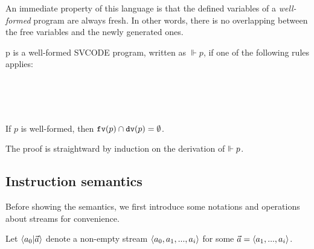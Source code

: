 An immediate property of this language is that the defined variables of a \emph{well-formed} \fmsvcode program are always fresh. In other words, there is no overlapping between the free variables and the newly generated ones.

\begin{defi}
	p is a well-formed SVCODE program, written as $\Vdash p$, if one of the following rules applies:
\end{defi}
	
	\PT{\Axiom{\wf{\epsilon}}}
    \\[3ex]
   	
   	\\[3ex]
   
   \\[3ex]
   


\begin{lem}
	If $p$ is well-formed, then  $\mathtt{fv}(p) \cap \mathtt{dv}(p) = \emptyset $. 
\end{lem}

The proof is straightward by induction on the derivation of $\Vdash p$.


\subsection{Instruction semantics}

Before showing the semantics, we first introduce some notations and operations about streams for convenience.
\begin{nota}
	Let $\< a_0 | \a \'>$ denote a non-empty stream $\< a_0,a_1,...,a_i \'>$ for some $\a = \< a_1,...,a_i \'>$. 
\end{nota}


